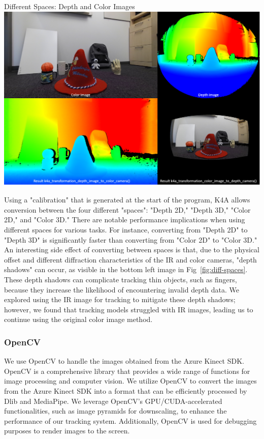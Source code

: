 \begin{figureBox}[label={fig:diff-spaces}, width=0.8\linewidth]{Different Spaces: Depth and Color Images \cite{noauthor_use_nodate}}
    \includegraphics[width=1.0\linewidth]{./implementation/figures/different spaces.png}
\end{figureBox}

Using a "calibration" that is generated at the start of the program, K4A allows conversion between the four different "spaces": "Depth 2D," "Depth 3D," "Color 2D," and "Color 3D." There are notable performance implications when using different spaces for various tasks. For instance, converting from "Depth 2D" to "Depth 3D" is significantly faster than converting from "Color 2D" to "Color 3D." \\

An interesting side effect of converting between spaces is that, due to the physical offset and different diffraction characteristics of the IR and color cameras, "depth shadows" \cite{Kersten1997-so} can occur, as visible in the bottom left image in Fig~\ref{fig:diff-spaces}. These depth shadows can complicate tracking thin objects, such as fingers, because they increase the likelihood of encountering invalid depth data. We explored using the IR image for tracking to mitigate these depth shadows; however, we found that tracking models struggled with IR images, leading us to continue using the original color image method.

\subsubsection{OpenCV}

We use OpenCV \cite{bradski2008learning} to handle the images obtained from the Azure Kinect SDK. OpenCV is a comprehensive library that provides a wide range of functions for image processing and computer vision. We utilize OpenCV to convert the images from the Azure Kinect SDK into a format that can be efficiently processed by Dlib and MediaPipe. We leverage OpenCV's GPU/CUDA-accelerated functionalities, such as image pyramids for downscaling, to enhance the performance of our tracking system. Additionally, OpenCV is used for debugging purposes to render images to the screen.

